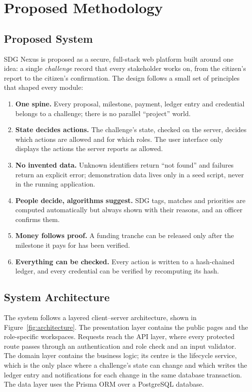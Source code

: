 \chapter{Proposed Methodology}

\section{Proposed System}
SDG Nexus is proposed as a secure, full-stack web platform built around one idea: a single \emph{challenge} record that every stakeholder works on, from the citizen's report to the citizen's confirmation. The design follows a small set of principles that shaped every module:
\begin{enumerate}
  \item \textbf{One spine.} Every proposal, milestone, payment, ledger entry and credential belongs to a challenge; there is no parallel ``project'' world.
  \item \textbf{State decides actions.} The challenge's state, checked on the server, decides which actions are allowed and for which roles. The user interface only displays the actions the server reports as allowed.
  \item \textbf{No invented data.} Unknown identifiers return ``not found'' and failures return an explicit error; demonstration data lives only in a seed script, never in the running application.
  \item \textbf{People decide, algorithms suggest.} SDG tags, matches and priorities are computed automatically but always shown with their reasons, and an officer confirms them.
  \item \textbf{Money follows proof.} A funding tranche can be released only after the milestone it pays for has been verified.
  \item \textbf{Everything can be checked.} Every action is written to a hash-chained ledger, and every credential can be verified by recomputing its hash.
\end{enumerate}

\section{System Architecture}
The system follows a layered client--server architecture, shown in Figure~\ref{fig:architecture}. The presentation layer contains the public pages and the role-specific workspaces. Requests reach the API layer, where every protected route passes through an authentication and role check and an input validator. The domain layer contains the business logic; its centre is the lifecycle service, which is the only place where a challenge's state can change and which writes the ledger entry and notifications for each change in the same database transaction. The data layer uses the Prisma ORM over a PostgreSQL database.

